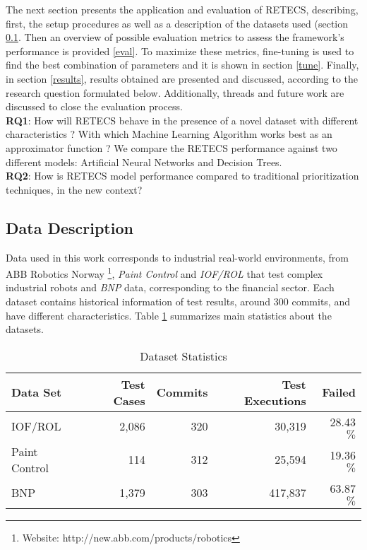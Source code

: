 The next section presents the application and evaluation of RETECS, describing, first, the setup procedures as well as a description of the datasets used (section \ref{data}. Then an overview of possible evaluation metrics to assess the framework's performance is provided \ref{eval}. To maximize these metrics, fine-tuning is used to find the best combination of parameters and it is shown in section \ref{tune}. Finally, in section \ref{results}, results obtained are presented and discussed, according to the research question formulated below. Additionally, threads and future work are discussed to close the evaluation process.
\\

\textbf{RQ1}: How will RETECS behave in the presence of a novel dataset with different characteristics ? With which Machine Learning Algorithm works best as an approximator function ? We compare the RETECS performance against two different models: Artificial Neural Networks and Decision Trees.
\\

\textbf{RQ2}: How is RETECS model performance compared to traditional prioritization techniques, in the new context?

\subsection{Data Description}\label{data}

Data used in this work corresponds to industrial real-world environments, from ABB Robotics Norway \footnote{Website: http://new.abb.com/products/robotics}, \textit{Paint Control} and \textit{IOF/ROL} that test complex industrial robots and \textit{BNP} data, corresponding to the financial sector. Each dataset contains historical information of test results, around 300 commits, and have different characteristics. Table \ref{datasets} summarizes main statistics about the datasets.

\begin{table}[H]
	\begin{tabular}{lrrrr}
		\hline
		Data Set      & Test Cases & Commits & Test Executions & Failed     \\ \hline
		IOF/ROL       & 2,086      & 320     & 30,319          & 28.43 $\%$ \\
		Paint Control & 114        & 312     & 25,594          & 19.36 $\%$ \\
		BNP           & 1,379      & 303     & 417,837         & 63.87 $\%$ \\ \hline
	\end{tabular}
	\caption{Dataset Statistics}
	\label{datasets}
\end{table}

